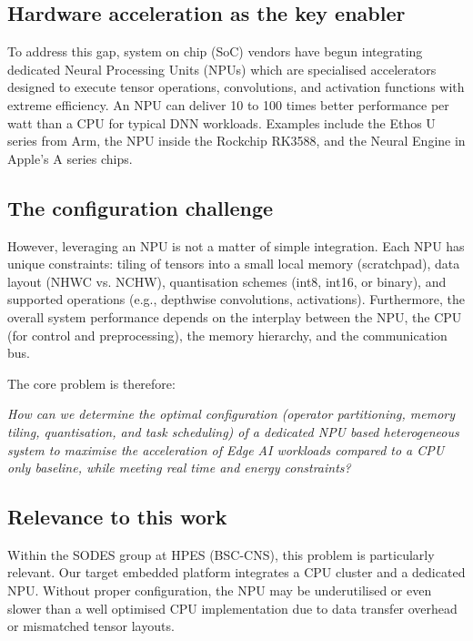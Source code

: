 \subsection{Hardware acceleration as the key enabler}
To address this gap, system on chip (SoC) vendors have begun integrating dedicated Neural Processing Units (NPUs) which are specialised accelerators designed to execute tensor operations, convolutions, and activation functions with extreme efficiency. An NPU can deliver 10 to 100 times better performance per watt than a CPU for typical DNN workloads. Examples include the Ethos U series from Arm, the NPU inside the Rockchip RK3588, and the Neural Engine in Apple’s A series chips.

\subsection{The configuration challenge}
However, leveraging an NPU is not a matter of simple integration. Each NPU has unique constraints: tiling of tensors into a small local memory (scratchpad), data layout (NHWC vs. NCHW), quantisation schemes (int8, int16, or binary), and supported operations (e.g., depthwise convolutions, activations). Furthermore, the overall system performance depends on the interplay between the NPU, the CPU (for control and preprocessing), the memory hierarchy, and the communication bus.

The core problem is therefore:

\begin{center}
    \textit{How can we determine the optimal configuration (operator partitioning, memory tiling, quantisation, and task scheduling) of a dedicated NPU based heterogeneous system to maximise the acceleration of Edge AI workloads compared to a CPU only baseline, while meeting real time and energy constraints?}
\end{center}

\subsection{Relevance to this work}
Within the SODES group at HPES (BSC-CNS), this problem is particularly relevant. Our target embedded platform integrates a CPU cluster and a dedicated NPU. Without proper configuration, the NPU may be underutilised or even slower than a well optimised CPU implementation due to data transfer overhead or mismatched tensor layouts.

